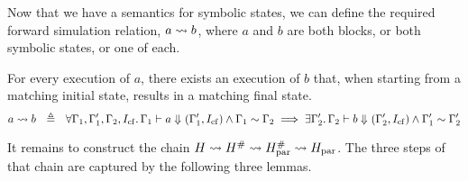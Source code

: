 {Now that we have a semantics for symbolic states, we can define the required
forward simulation relation, $a \mathrel{\leadsto} b$, where $a$ and $b$ are both blocks, or
both symbolic states, or one of each.


\begin{definition}
  For every execution of $a$, there exists an execution of $b$ that,
  when starting from a matching initial state, results in a matching final state.
  \begin{equation*}
      a \curly b\ \ \defeq\ \ \forall\context_1, \context_1',
        \context_2, \cfinstr\ldotp
        \sem{}{\context_1}{a}{(\context_1', \cfinstr)} \land
        \context_1 \sim \context_2 \implies
      \exists\context_2'\ldotp \sem{}{\context_2}{b}{(\context_2', \cfinstr)}
 \land \context_1' \sim \context_2'\\
  \end{equation*}
\end{definition}

It remains to construct the chain
$H \mathrel{\leadsto} H^{\#} \mathrel{\leadsto} H_\text{par}^{\#} \mathrel{\leadsto} H_\text{par}$. The
three steps of that chain are captured by the following three lemmas.

}
